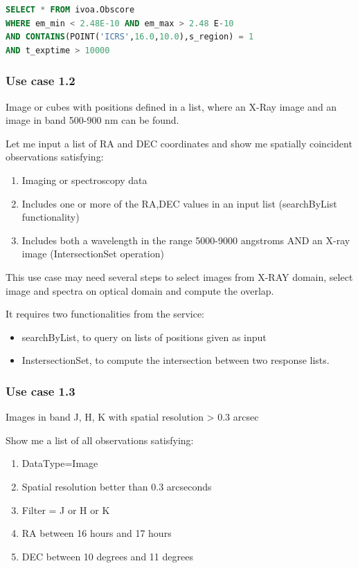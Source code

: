 \documentclass[11pt,a4paper]{ivoa}
\begin{document}
\begin{lstlisting}[language=SQL,flexiblecolumns=true]
SELECT * FROM ivoa.Obscore
WHERE em_min < 2.48E-10 AND em_max > 2.48 E-10
AND CONTAINS(POINT('ICRS',16.0,10.0),s_region) = 1
AND t_exptime > 10000
\end{lstlisting}

\subsubsection{Use case 1.2}
Image or cubes with positions defined in a list, where an X-Ray image and an image in band 500-900 nm can be found.

Let me input a list of RA and DEC coordinates and show me spatially coincident observations satisfying:

\begin{enumerate}
\item Imaging or spectroscopy data
\item Includes one or more of the RA,DEC values in an input list (searchByList functionality)
\item Includes both a wavelength in the range 5000-9000 angstroms AND an X-ray image (IntersectionSet operation)
\end{enumerate}
This use case may need several steps to select images from X-RAY domain, select image and spectra on optical domain and
compute the overlap.

It requires two functionalities from the service:

\begin{itemize}
\item searchByList, to query on lists of positions given as input
\item InstersectionSet, to compute the intersection between two response lists.
\end{itemize}
\subsubsection{Use case 1.3}
Images in band J, H, K with spatial resolution {\textgreater} 0.3 arcsec

Show me a list of all observations satisfying:

\begin{enumerate}
\item DataType=Image
\item Spatial resolution better than 0.3 arcseconds
\item Filter = J or H or K
\item RA between 16 hours and 17 hours
\item DEC between 10 degrees and 11 degrees
\end{enumerate}
\end{document}
